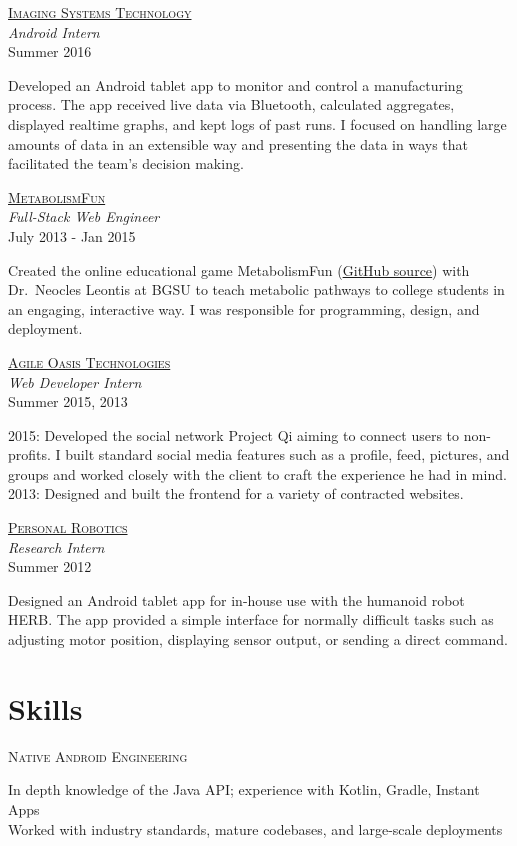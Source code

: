 \documentclass[letterpaper,10pt]{article}
\newcommand{\lb}{\vspace{4pt} \\}
\newenvironment{resumecols1}[1]
{
    \vspace{.1cm}
    \begin{minipage}[t]{.21\linewidth}
        \begin{flushright}
            \textsc{#1}
        \end{flushright}
    \end{minipage}
    \hspace{.005\linewidth}
    \begin{minipage}[t]{.77\linewidth}
}
{
    \end{minipage}
    \vspace{.1cm}
}
\newenvironment{resumecols}[4]
{
    \vspace{.1cm}
    \begin{minipage}[t]{.21\linewidth}
        \begin{flushright}
            \href{#2}{\textsc{#1}} \\
            \small{\textit{#3}} \\
            \small{#4}
        \end{flushright}
    \end{minipage}
    \hspace{.005\linewidth}
    \begin{minipage}[t]{.77\linewidth}
}
{
    \end{minipage}
    \vspace{.1cm}
}
\begin{document}
\begin{resumecols}{Imaging Systems Technology}{http://www.teamist.com}{Android Intern}{Summer 2016}
    Developed an Android tablet app to monitor and control a manufacturing process. The app received live data via Bluetooth, calculated aggregates, displayed realtime graphs, and kept logs of past runs. I focused on handling large amounts of data in an extensible way and presenting the data in ways that facilitated the team's decision making.
\end{resumecols}

\begin{resumecols}{MetabolismFun}{https://github.com/dzirbel/metabolism-fun}{Full-Stack Web Engineer}{July 2013 - Jan 2015}
    Created the online educational game MetabolismFun (\href{https://github.com/dzirbel/metabolism-fun}{\underline{GitHub source}}) with Dr.\ Neocles Leontis at BGSU to teach metabolic pathways to college students in an engaging, interactive way. I was responsible for programming, design, and deployment.
\end{resumecols}

\begin{resumecols}{Agile Oasis Technologies}{http://agileoasis.com}{Web Developer Intern}{Summer 2015, 2013}
    2015: Developed the social network Project Qi aiming to connect users to non-profits. I built standard social media features such as a profile, feed, pictures, and groups and worked closely with the client to craft the experience he had in mind.
    \lb
    2013: Designed and built the frontend for a variety of contracted websites.
\end{resumecols}

\begin{resumecols}{Personal Robotics}{https://personalrobotics.cs.washington.edu}{Research Intern}{Summer 2012}
    Designed an Android tablet app for in-house use with the humanoid robot HERB. The app provided a simple interface for normally difficult tasks such as adjusting motor position, displaying sensor output, or sending a direct command.
\end{resumecols}

\section{Skills}

\begin{resumecols1}{Native Android Engineering}
    In depth knowledge of the Java API; experience with Kotlin, Gradle, Instant Apps \\
    Worked with industry standards, mature codebases, and large-scale deployments
\end{resumecols1}
\end{document}
